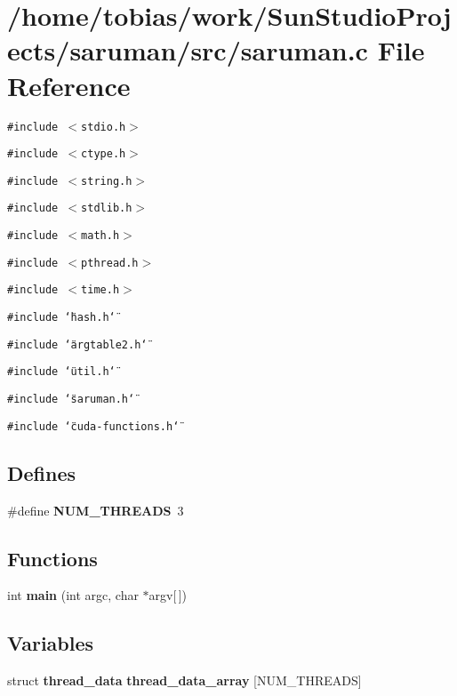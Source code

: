 \section{/home/tobias/work/SunStudioProjects/saruman/src/saruman.c File Reference}
\label{saruman_8c}
{\tt \#include $<$stdio.h$>$}\par
{\tt \#include $<$ctype.h$>$}\par
{\tt \#include $<$string.h$>$}\par
{\tt \#include $<$stdlib.h$>$}\par
{\tt \#include $<$math.h$>$}\par
{\tt \#include $<$pthread.h$>$}\par
{\tt \#include $<$time.h$>$}\par
{\tt \#include \char`\"{}hash.h\char`\"{}}\par
{\tt \#include \char`\"{}argtable2.h\char`\"{}}\par
{\tt \#include \char`\"{}util.h\char`\"{}}\par
{\tt \#include \char`\"{}saruman.h\char`\"{}}\par
{\tt \#include \char`\"{}cuda-functions.h\char`\"{}}\par
\subsection*{Defines}
\begin{CompactItemize}
\item 
\#define {\bf NUM\_\-THREADS}~3
\end{CompactItemize}
\subsection*{Functions}
\begin{CompactItemize}
\item 
int {\bf main} (int argc, char $\ast$argv[$\,$])
\end{CompactItemize}
\subsection*{Variables}
\begin{CompactItemize}
\item 
struct {\bf thread\_\-data} {\bf thread\_\-data\_\-array} [NUM\_\-THREADS]
\end{CompactItemize}


